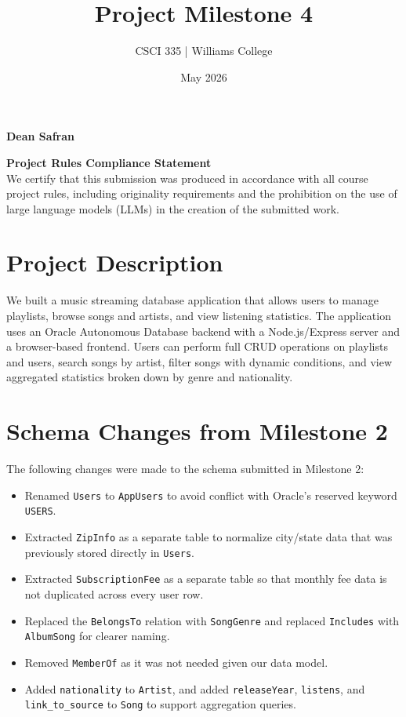 \documentclass{article}
\title{Project Milestone 4}
\author{CSCI 335 | Williams College}
\date{May 2026}
\begin{document}
\maketitle
\vfill
\begin{center}
    {\textbf{Dean Safran}\\[0.3cm]}

    \vspace{0.5cm}

    {\textbf{Project Rules Compliance Statement}\\[0.3cm]
    We certify that this submission was produced in accordance with all
    course project rules, including originality requirements and the
    prohibition on the use of large language models (LLMs) in the
    creation of the submitted work.}
\end{center}
\vfill

\newpage

\section{Project Description}

We built a music streaming database application that allows users to manage
playlists, browse songs and artists, and view listening statistics. The
application uses an Oracle Autonomous Database backend with a Node.js/Express
server and a browser-based frontend. Users can perform full CRUD operations on
playlists and users, search songs by artist, filter songs with dynamic
conditions, and view aggregated statistics broken down by genre and nationality.

\section{Schema Changes from Milestone 2}

The following changes were made to the schema submitted in Milestone 2:

\begin{itemize}
    \item Renamed \texttt{Users} to \texttt{AppUsers} to avoid conflict with Oracle's reserved keyword \texttt{USERS}.
    \item Extracted \texttt{ZipInfo} as a separate table to normalize city/state data that was previously stored directly in \texttt{Users}.
    \item Extracted \texttt{SubscriptionFee} as a separate table so that monthly fee data is not duplicated across every user row.
    \item Replaced the \texttt{BelongsTo} relation with \texttt{SongGenre} and replaced \texttt{Includes} with \texttt{AlbumSong} for clearer naming.
    \item Removed \texttt{MemberOf} as it was not needed given our data model.
    \item Added \texttt{nationality} to \texttt{Artist}, and added \texttt{releaseYear}, \texttt{listens}, and \texttt{link\_to\_source} to \texttt{Song} to support aggregation queries.
\end{itemize}
\end{document}
